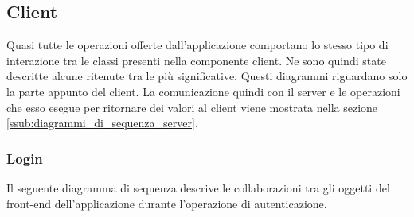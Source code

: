 %


\subsection{Client} %
\label{ssub:diagrammi_di_sequenza_client}
Quasi tutte le operazioni offerte dall'applicazione comportano lo stesso tipo di interazione tra le classi presenti nella componente client. Ne sono quindi state descritte alcune ritenute tra le più significative. \newline
Questi diagrammi riguardano solo la parte appunto del client. La comunicazione quindi con il server e le operazioni che esso esegue per ritornare dei valori al client viene mostrata nella sezione \ref{ssub:diagrammi_di_sequenza_server}.

	\subsubsection{Login} %
	\label{ssub:login}
	Il seguente diagramma di sequenza descrive le collaborazioni tra gli oggetti del front-end dell'applicazione durante l'operazione di autenticazione. \newline


